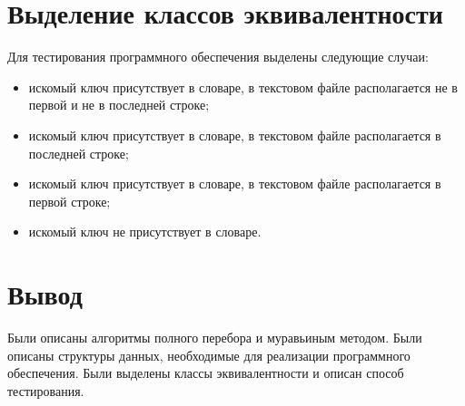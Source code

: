 \section{Выделение классов эквивалентности}

Для тестирования программного обеспечения выделены следующие случаи:
\begin{itemize}
	\item искомый ключ присутствует в словаре, в текстовом файле располагается не в первой и не в последней строке;
	\item искомый ключ присутствует в словаре, в текстовом файле располагается в последней строке;
	\item искомый ключ присутствует в словаре, в текстовом файле располагается в первой строке;
	\item искомый ключ не присутствует в словаре.
\end{itemize}

\section{Вывод}
Были описаны алгоритмы полного перебора и муравьиным методом. Были описаны структуры данных, необходимые для реализации программного обеспечения. Были выделены классы эквивалентности и описан способ тестирования.
